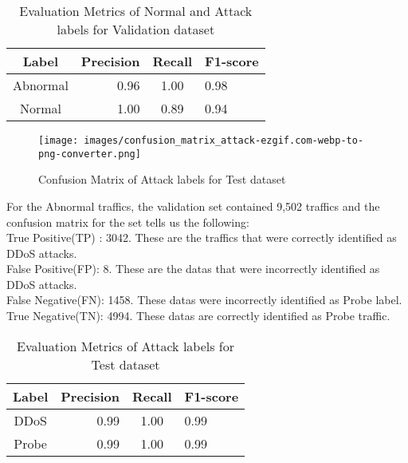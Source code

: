 \begin{table}[tbh]
	\centering
	\caption{Evaluation Metrics of Normal and Attack labels for Validation dataset}
	\begin{tabular}{|c|r|c|l|} %
		\hline %
		Label  &Precision &Recall &F1-score \\
		\hline %
		Abnormal &0.96 &1.00 &0.98 \\
		\hline %
		Normal &1.00 &0.89 &0.94\\
		\hline
	\end{tabular}
	\label{Evaluation Metrics of Normal and Attack labels for validation dataset}
\end{table}
\begin{figure}[H] %
	\begin{center}
		\texttt{[image: images/confusion\_matrix\_attack-ezgif.com-webp-to-png-converter.png]} 
		\caption{Confusion Matrix of Attack labels for Test dataset} %
		\label{Confusion Matrix of Attack labels for Test dataset} 
	\end{center}
\end{figure}
For the Abnormal traffics, the validation set contained 9,502 traffics and the confusion matrix for the set tells us the following:\\ 
True Positive(TP) : 3042. These are the traffics that were correctly identified as DDoS attacks.\\
False Positive(FP): 8. These are the datas that were incorrectly identified as DDoS attacks.\\
False Negative(FN): 1458. These datas were incorrectly identified as Probe label.\\
True Negative(TN): 4994. These datas are correctly identified as Probe traffic.\\
\begin{table}[t]
	\centering
	\caption{Evaluation Metrics of Attack labels for Test dataset}
	\begin{tabular}{|c|r|c|l|} %
		\hline %
		Label  &Precision &Recall &F1-score \\
		\hline %
		DDoS &0.99 &1.00 &0.99 \\
		\hline %
		Probe &0.99 &1.00 &0.99\\
		\hline
	\end{tabular}
	\label{Evaluation Metrics of Attack labels for test dataset}
\end{table}
